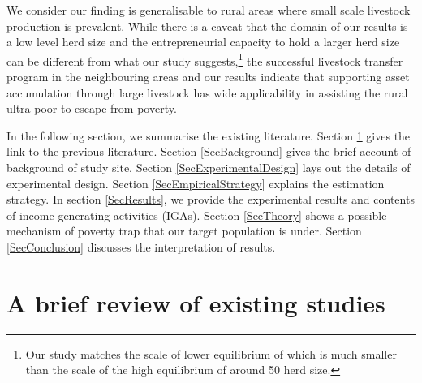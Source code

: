 	We consider our finding is generalisable to rural areas where small scale livestock production is prevalent. While there is a caveat that the domain of our results is a low level herd size and the entrepreneurial capacity to hold a larger herd size can be different from what our study suggests,\footnote{Our study matches the scale of lower equilibrium of \citet{Lybbertetal2004} which is much smaller than the scale of the high equilibrium of around 50 herd size. } the successful livestock transfer program in the neighbouring areas \citep{BandieraBRAC2017, Balboni2020} and our results indicate that supporting asset accumulation through large livestock has wide applicability in assisting the rural ultra poor to escape from poverty.


	In the following section, we summarise the existing literature. Section \ref{SecExistingStudies} gives the link to the previous literature. Section \ref{SecBackground} gives the brief account of background of study site. Section \ref{SecExperimentalDesign} lays out the details of experimental design. Section \ref{SecEmpiricalStrategy} explains the estimation strategy. In section \ref{SecResults}, we provide the experimental results and contents of income generating activities (IGAs). Section \ref{SecTheory} shows a possible mechanism of poverty trap that our target population is under. Section \ref{SecConclusion} discusses the interpretation of results.

\section{A brief review of existing studies}
\label{SecExistingStudies}


